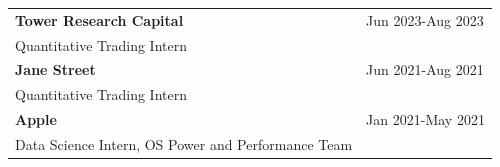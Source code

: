 \begin{longtable}[l]{@{}p{} >{\raggedleft\arraybackslash}p{}@{}}
    \textbf{Tower Research Capital} & Jun 2023-Aug 2023 \\
    Quantitative Trading Intern & \\[0.3em]
    \textbf{Jane Street} & Jun 2021-Aug 2021 \\
    Quantitative Trading Intern & \\[0.3em]
    \textbf{Apple} & Jan 2021-May 2021 \\
    Data Science Intern, OS Power and Performance Team &
\end{longtable}